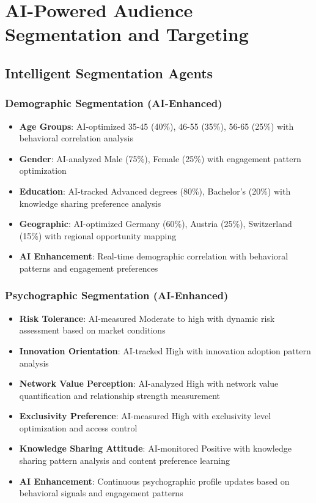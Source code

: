 \section{AI-Powered Audience Segmentation and Targeting}

\subsection{Intelligent Segmentation Agents}

\subsubsection{Demographic Segmentation (AI-Enhanced)}

\begin{itemize}
    \item \textbf{Age Groups}: AI-optimized 35-45 (40\%), 46-55 (35\%), 56-65 (25\%) with behavioral correlation analysis
    \item \textbf{Gender}: AI-analyzed Male (75\%), Female (25\%) with engagement pattern optimization
    \item \textbf{Education}: AI-tracked Advanced degrees (80\%), Bachelor's (20\%) with knowledge sharing preference analysis
    \item \textbf{Geographic}: AI-optimized Germany (60\%), Austria (25\%), Switzerland (15\%) with regional opportunity mapping
    \item \textbf{AI Enhancement}: Real-time demographic correlation with behavioral patterns and engagement preferences
\end{itemize}

\subsubsection{Psychographic Segmentation (AI-Enhanced)}

\begin{itemize}
    \item \textbf{Risk Tolerance}: AI-measured Moderate to high with dynamic risk assessment based on market conditions
    \item \textbf{Innovation Orientation}: AI-tracked High with innovation adoption pattern analysis
    \item \textbf{Network Value Perception}: AI-analyzed High with network value quantification and relationship strength measurement
    \item \textbf{Exclusivity Preference}: AI-measured High with exclusivity level optimization and access control
    \item \textbf{Knowledge Sharing Attitude}: AI-monitored Positive with knowledge sharing pattern analysis and content preference learning
    \item \textbf{AI Enhancement}: Continuous psychographic profile updates based on behavioral signals and engagement patterns
\end{itemize}

